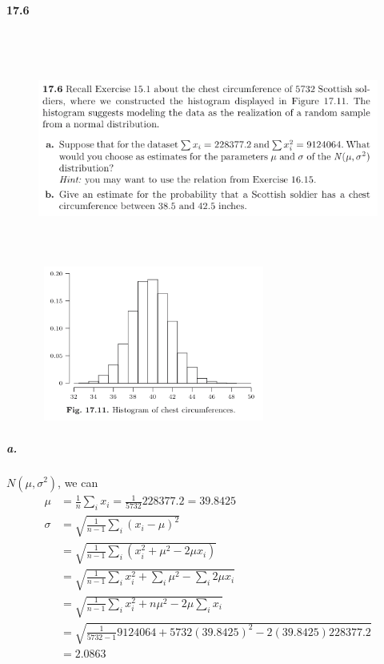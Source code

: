 \documentclass{article} %
\begin{document}
\paragraph*{17.6} 
\begin{figure}[h!]
\centering
\includegraphics[width=5.5in, height=3in]{2.png}\\
\includegraphics[width=3in, height=2in]{3.png}\\
\end{figure}

\subparagraph*{a.}
$N(\mu, \sigma^2)$, we can 
\begin{align*}
\mu  & = \frac{1}{n}\sum_i x_i = \frac{1}{5732} 228377.2 =  39.8425 \\
\sigma & = \sqrt{\frac{1}{n-1} \sum_i \left( x_i - \mu \right)^2}  \\
& = \sqrt{\frac{1}{n-1} \sum_i \left( x_i ^2 + \mu^2 - 2\mu x_i\right)} \\
& = \sqrt{\frac{1}{n-1} \sum_i x_i^2 + \sum_i \mu^2 - \sum_i 2\mu x_i}\\
& = \sqrt{\frac{1}{n-1} \sum_i x_i^2 +  n \mu^2 - 2\mu \sum_i x_i}\\
& = \sqrt{\frac{1}{5732-1} 9124064 + 5732(39.8425)^2 - 2(39.8425) 228377.2 }\\
& =   2.0863
\end{align*}
\end{document}
